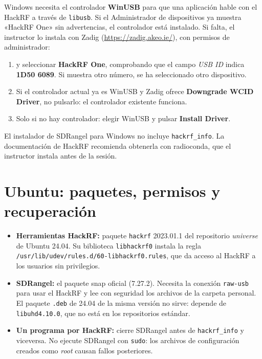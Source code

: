 Windows necesita el controlador \textbf{WinUSB} para que una aplicación hable con el HackRF a través de \texttt{libusb}. Si el Administrador de dispositivos ya muestra «HackRF One» sin advertencias, el controlador está instalado. Si falta, el instructor lo instala con Zadig (\url{https://zadig.akeo.ie/}), con permisos de administrador:
\begin{enumerate}
  \item {} y seleccionar \textbf{HackRF One}, comprobando que el campo \emph{USB ID} indica \textbf{1D50 6089}. Si muestra otro número, se ha seleccionado otro dispositivo.
  \item Si el controlador actual ya es WinUSB y Zadig ofrece \textbf{Downgrade WCID Driver}, no pulsarlo: el controlador existente funciona.
  \item Solo si no hay controlador: elegir WinUSB y pulsar \textbf{Install Driver}.
\end{enumerate}
El instalador de SDRangel para Windows no incluye \texttt{hackrf\_info}. La documentación de HackRF recomienda obtenerla con radioconda, que el instructor instala antes de la sesión.

\section{Ubuntu: paquetes, permisos y recuperación}
\label{sec:a-ubuntu}

\begin{itemize}
  \item \textbf{Herramientas HackRF:} paquete \texttt{hackrf} 2023.01.1 del repositorio \emph{universe} de Ubuntu 24.04. Su biblioteca \texttt{libhackrf0} instala la regla \texttt{/usr/lib/udev/rules.d/60-libhackrf0.rules}, que da acceso al HackRF a los usuarios sin privilegios.
  \item \textbf{SDRangel:} el paquete snap oficial (7.27.2). Necesita la conexión \texttt{raw-usb} para usar el HackRF y lee con seguridad los archivos de la carpeta personal. El paquete \texttt{.deb} de 24.04 de la misma versión no sirve: depende de \texttt{libuhd4.10.0}, que no está en los repositorios estándar.
  \item \textbf{Un programa por HackRF:} cierre SDRangel antes de \texttt{hackrf\_info} y viceversa. No ejecute SDRangel con \texttt{sudo}: los archivos de configuración creados como \emph{root} causan fallos posteriores.
\end{itemize}

